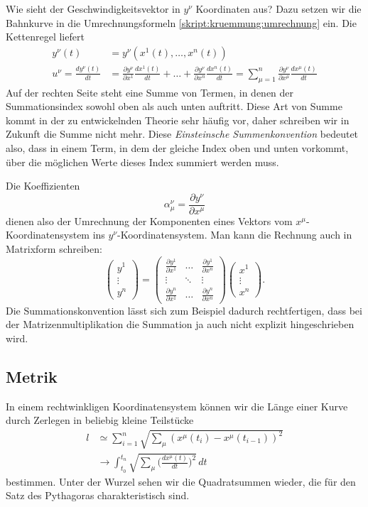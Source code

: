 Wie sieht der Geschwindigkeitsvektor in $y^{\nu}$ Koordinaten aus?
Dazu setzen wir die Bahnkurve in die Umrechnungsformeln
\eqref{skript:kruemmung:umrechnung} ein.
Die Kettenregel liefert
\begin{align*}
y^{\nu}(t)&=y^{\nu}(x^1(t),\dots,x^n(t))
\\
u^{\nu}
=
\frac{dy^{\nu}(t)}{dt}
&=
\frac{\partial y^{\nu}}{\partial x^1}\frac{dx^1(t)}{dt}
+\dots+
\frac{\partial y^{\nu}}{\partial x^n}\frac{dx^n(t)}{dt}
=
\sum_{\mu=1}^n
\frac{\partial y^{\nu}}{\partial x^{\mu}}\frac{dx^{\mu}(t)}{dt}
\end{align*}
Auf der rechten Seite steht eine Summe von Termen, in denen
der Summationsindex sowohl oben als auch unten auftritt.
Diese Art von Summe kommt in der zu entwickelnden Theorie sehr
häufig vor, daher schreiben wir in Zukunft die Summe nicht mehr.
Diese {\em Einsteinsche Summenkonvention} bedeutet also, dass in
einem Term, in dem der gleiche Index oben und unten vorkommt,
über die möglichen Werte dieses Index summiert werden muss.

Die Koeffizienten 
\[
\alpha_\mu^\nu=\frac{\partial y^{\nu}}{\partial x^{\mu}}
\]
dienen also der Umrechnung der Komponenten eines Vektors vom
$x^{\mu}$-Koordinatensystem ins $y^{\nu}$-Koordinatensystem.
Man kann die Rechnung auch in Matrixform schreiben:
\[
\begin{pmatrix}y^1\\\vdots\\y^n\end{pmatrix}
=
\begin{pmatrix}
\frac{\partial y^1}{\partial x^1}&\dots&\frac{\partial y^1}{\partial x^n}\\
\vdots&\ddots&\vdots\\
\frac{\partial y^n}{\partial x^1}&\dots&\frac{\partial y^n}{\partial x^n}
\end{pmatrix}
\begin{pmatrix}x^1\\\vdots\\x^n\end{pmatrix}.
\]
Die Summationskonvention lässt sich zum Beispiel dadurch rechtfertigen,
dass bei der Matrizenmultiplikation die Summation ja auch nicht
explizit hingeschrieben wird.

\subsection{Metrik}
In einem rechtwinkligen Koordinatensystem können wir die Länge
einer Kurve durch Zerlegen in beliebig kleine Teilstücke 
\begin{align*}
l
&\simeq
\sum_{i=1}^n \sqrt{\sum_{\mu} (x^{\mu}(t_i)-x^{\mu}(t_{i-1}))^2}
\\
&\rightarrow
\int_{t_0}^{t_n} \sqrt{\sum_{\mu}\biggl(\frac{dx^{\mu}(t)}{dt}\biggr)^2}\,dt
\end{align*}
bestimmen.
Unter der Wurzel sehen wir die Quadratsummen wieder, die für den
Satz des Pythagoras charakteristisch sind.

